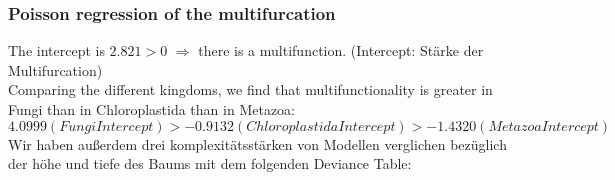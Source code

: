       \subsubsection{Poisson regression of the multifurcation}
        The intercept is $2.821 > 0$ $\Rightarrow$ there is a multifunction.
        (Intercept: Stärke der Multifurcation) \\
        Comparing the different kingdoms, we find that multifunctionality is greater in Fungi than in 
        Chloroplastida than in Metazoa:
        $$4.0999 (Fungi Intercept) > -0.9132 (Chloroplastida Intercept) > -1.4320 (Metazoa Intercept)$$
        Wir haben außerdem drei komplexitätsstärken von Modellen verglichen bezüglich der höhe und tiefe 
          des Baums mit dem folgenden Deviance Table:

